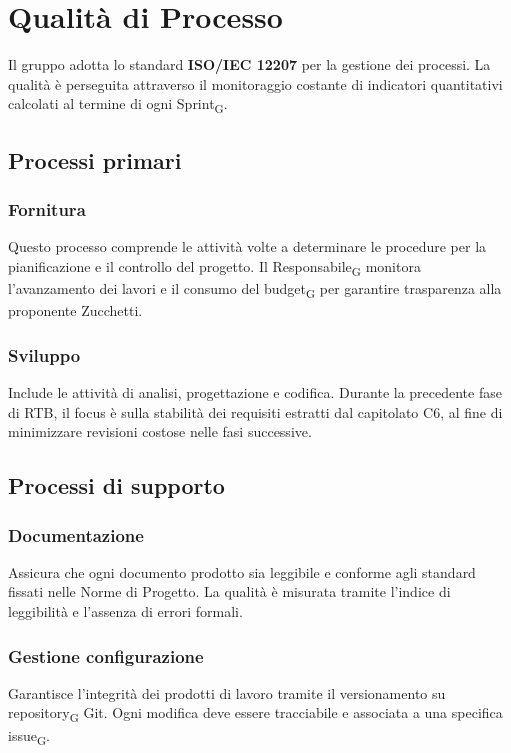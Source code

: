 \section{Qualità di Processo}
Il gruppo adotta lo standard \textbf{ISO/IEC 12207} per la gestione dei processi. La qualità è perseguita attraverso il monitoraggio costante di indicatori quantitativi calcolati al termine di ogni Sprint\textsubscript{G}.

\subsection{Processi primari}
\subsubsection{Fornitura}
Questo processo comprende le attività volte a determinare le procedure per la pianificazione e il controllo del progetto. Il Responsabile\textsubscript{G} monitora l'avanzamento dei lavori e il consumo del budget\textsubscript{G} per garantire trasparenza alla proponente Zucchetti.

\subsubsection{Sviluppo}
Include le attività di analisi, progettazione e codifica. Durante la precedente fase di RTB, il focus è sulla stabilità dei requisiti estratti dal capitolato C6, al fine di minimizzare revisioni costose nelle fasi successive.

\subsection{Processi di supporto}
\subsubsection{Documentazione}
Assicura che ogni documento prodotto sia leggibile e conforme agli standard fissati nelle Norme di Progetto. La qualità è misurata tramite l'indice di leggibilità e l'assenza di errori formali.

\subsubsection{Gestione configurazione}
Garantisce l'integrità dei prodotti di lavoro tramite il versionamento su repository\textsubscript{G} Git. Ogni modifica deve essere tracciabile e associata a una specifica issue\textsubscript{G}.

